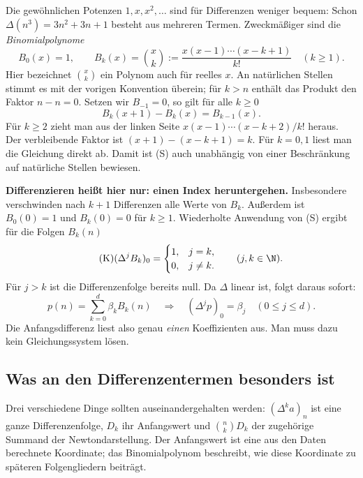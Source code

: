 Die gewöhnlichen Potenzen $1,x,x^2,\ldots$ sind für Differenzen
weniger bequem: Schon $\Delta(n^3)=3n^2+3n+1$ besteht aus mehreren
Termen. Zweckmäßiger sind die \emph{Binomialpolynome}
\begin{equation}\tag{B}\label{newton:basis}
 B_0(x)=1,\qquad
 B_k(x)=\binom xk:=\frac{x(x-1)\cdots(x-k+1)}{k!}\quad(k\geq1).
\end{equation}
Hier bezeichnet $\binom xk$ ein Polynom auch für reelles $x$.
An natürlichen Stellen stimmt es mit der vorigen Konvention überein;
für $k>n$ enthält das Produkt den Faktor $n-n=0$.
Setzen wir $B_{-1}=0$, so gilt für alle $k\geq0$
\begin{equation}\tag{S}\label{newton:lowering}
 B_k(x+1)-B_k(x)=B_{k-1}(x).
\end{equation}
Für $k\geq2$ zieht man aus der linken Seite
$x(x-1)\cdots(x-k+2)/k!$ heraus. Der verbleibende Faktor ist
$(x+1)-(x-k+1)=k$. Für $k=0,1$ liest man die Gleichung direkt ab.
Damit ist (S) auch unabhängig von einer Beschränkung auf natürliche
Stellen bewiesen.

\textbf{Differenzieren heißt hier nur: einen Index heruntergehen.}
Insbesondere verschwinden nach $k+1$ Differenzen alle Werte von $B_k$.
Außerdem ist $B_0(0)=1$ und $B_k(0)=0$ für $k\geq1$. Wiederholte
Anwendung von (S) ergibt für die Folgen $B_k(n)$
\begin{equation}\tag{K}\label{newton:coordinates}
 (\Delta^j B_k)_0=
 \begin{cases}1,&j=k,\\0,&j\ne k.\end{cases}
 \qquad(j,k\in\N).
\end{equation}
Für $j>k$ ist die Differenzenfolge bereits null.
Da $\Delta$ linear ist, folgt daraus sofort:
\[
 p(n)=\sum_{k=0}^d\beta_kB_k(n)
 \quad\Longrightarrow\quad (\Delta^jp)_0=\beta_j
 \quad(0\leq j\leq d).
\]
Die Anfangsdifferenz liest also genau \emph{einen} Koeffizienten aus.
Man muss dazu kein Gleichungssystem lösen.

\subsection*{Was an den Differenzentermen besonders ist}

Drei verschiedene Dinge sollten auseinandergehalten werden:
$(\Delta^ka)_n$ ist eine ganze Differenzenfolge, $D_k$ ihr Anfangswert
und $\binom nkD_k$ der zugehörige Summand der Newtondarstellung.
Der Anfangswert ist eine aus den Daten berechnete Koordinate;
das Binomialpolynom beschreibt, wie diese Koordinate zu späteren
Folgengliedern beiträgt.

